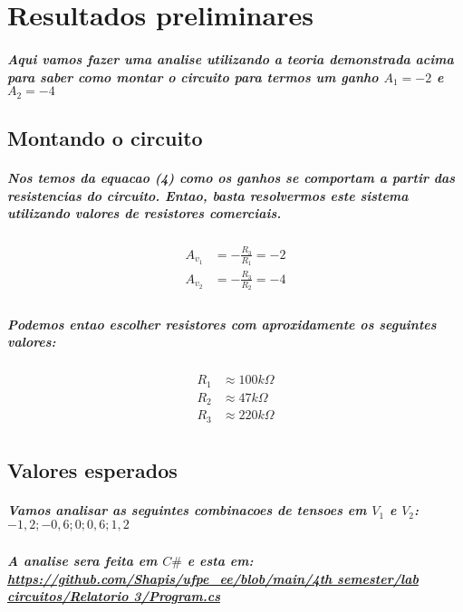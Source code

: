 \documentclass[12pt,twoside, a4paper, twocolumn]{article}
\begin{document}
\section{Resultados preliminares}

\subparagraph*{Aqui vamos fazer uma analise utilizando a teoria demonstrada acima para saber como montar o circuito para termos um ganho $A_1 = -2$ e $A_2 = -4$}
\subsection{Montando o circuito}
\subparagraph*{Nos temos da equacao (4) como os ganhos se comportam a partir das resistencias do circuito. Entao, basta resolvermos este sistema utilizando valores de resistores comerciais.}



\begin{equation}
    \begin{aligned}
        A_{v_1} & = -\frac{R_3}{R_1} = -2 \\
        A_{v_2} & = -\frac{R_3}{R_2} = -4 \\
    \end{aligned}
\end{equation}

\subparagraph*{Podemos entao escolher resistores com aproxidamente os seguintes valores:}

\begin{equation}
    \begin{aligned}
        R_1 & \approx 100k \varOmega \\
        R_2 & \approx 47k \varOmega  \\
        R_3 & \approx 220k \varOmega \\
    \end{aligned}
\end{equation}

\subsection{Valores esperados}

\subparagraph*{Vamos analisar as seguintes combinacoes de tensoes em $V_1$ e $V_2$: ${-1,2 ; -0,6 ; 0 ; 0,6 ; 1,2}$}

\subparagraph*{A analise sera feita em $C\#$ e esta em: \url{https://github.com/Shapis/ufpe_ee/blob/main/4th semester/lab circuitos/Relatorio 3/Program.cs}}
\end{document}
